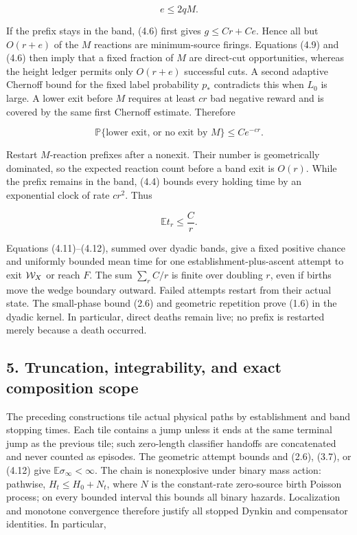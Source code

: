 \[
                              e\le 2qM.                \tag{4.10}
\]

If the prefix stays in the band, (4.6) first gives \(g\le Cr+Ce\). Hence
all but \(O(r+e)\) of the \(M\) reactions are minimum-source firings.
Equations (4.9) and (4.6) then imply that a fixed fraction of \(M\) are
direct-cut opportunities, whereas the height ledger permits only
\(O(r+e)\) successful cuts. A second adaptive Chernoff bound for the
fixed label probability \(p_*\) contradicts this when \(L_0\) is large.
A lower exit before \(M\) requires at least \(cr\) bad negative reward
and is covered by the same first Chernoff estimate. Therefore

\[
 \mathbb P\{\text{lower exit, or no exit by }M\}
                              \le Ce^{-cr}.            \tag{4.11}
\]

Restart \(M\)-reaction prefixes after a nonexit. Their number is
geometrically dominated, so the expected reaction count before a band
exit is \(O(r)\). While the prefix remains in the band, (4.4) bounds
every holding time by an exponential clock of rate \(cr^2\). Thus

\[
                              \mathbb E t_r\le \frac C r.             \tag{4.12}
\]

Equations (4.11)--(4.12), summed over dyadic bands, give a fixed
positive chance and uniformly bounded mean time for one
establishment-plus-ascent attempt to exit \({\cal W}_X\) or reach \(F\).
The sum \(\sum_r C/r\) is finite over doubling \(r\), even if births
move the wedge boundary outward. Failed attempts restart from their
actual state. The small-phase bound (2.6) and geometric repetition prove
(1.6) in the dyadic kernel. In particular, direct deaths remain live; no
prefix is restarted merely because a death occurred.

\subsection{5. Truncation, integrability, and exact composition
scope}

The preceding constructions tile actual physical paths by establishment
and band stopping times. Each tile contains a jump unless it ends at the
same terminal jump as the previous tile; such zero-length classifier
handoffs are concatenated and never counted as episodes. The geometric
attempt bounds and (2.6), (3.7), or (4.12) give
\(\mathbb E\sigma_\infty<\infty\). The chain is nonexplosive under
binary mass action: pathwise, \(H_t\le H_0+N_t\), where \(N\) is the
constant-rate zero-source birth Poisson process; on every bounded
interval this bounds all binary hazards. Localization and monotone
convergence therefore justify all stopped Dynkin and compensator
identities. In particular,

